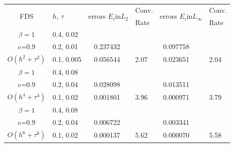 \documentclass[a0,portrait]{a0poster}
\begin{document}
\begin{multicols}{2}
\begin{center}\vspace{0.8cm}
		\begin{tabular}{||c|l|ll|ll||}
			\hline
			\hline
      \multirow{2  }{*}{FDS}        & \multirow{2  }{*}{$h$, $\tau$}  & \multirow{2  }{*}{errors $E_i$in$L_2$}  &Conv.& \multirow{2  }{*}{errors $E_i$in$L_\infty$}  &Conv.  \\
	         &                    &                               & Rate   &                                        & Rate \\
   			\hline 
					\hline 
       $\beta=1$       &0.4, 0.02        &             &            &           &   \\
                  c=0.9    &0.2, 0.01       &~ 0.237432  &            &~0.097758 &   \\
  $O(h^2+ \tau^2)$ &0.1, 0.005   &~ 0.056544  &2.07  &~0.023651 & 2.04 \\
			\hline
      $\beta=1$    &0.4, 0.08    &            &            &             &    \\
       c=0.9 &0.2, 0.04    &~ 0.028098   &           &~0.013511  &   \\
       $O(h^4+ \tau^4)$ &0.1, 0.02   &~ 0.001801 & 3.96    &~0.000971  & 3.79  \\
    \hline
  $\beta=1$     &0.4, 0.08   &            &          &                  &      \\
      c=0.9    &0.2, 0.04   &~ 0.006722 &           &~0.003341      &       \\
     $O(h^6+ \tau^6)$ &0.1, 0.02 &~ 0.000137 &5.62  &~0.000070 & 5.58        \\
	   \hline
			\hline 
\end{tabular}
\end{center}


\end{multicols}
\end{document}
